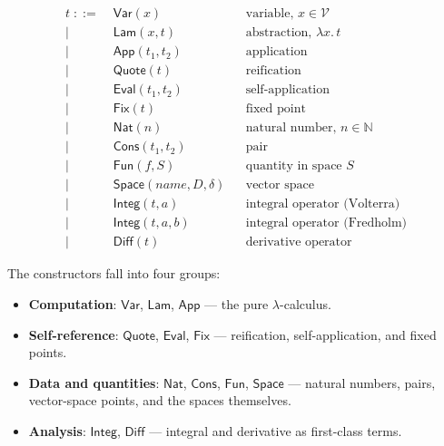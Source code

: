 \documentclass{lmcs}
\theoremstyle{plain}
\theoremstyle{definition}
\newcommand{\NN}{\mathbb{N}}
\newcommand{\fix}{\mathsf{Fix}}
\begin{document}
\begin{defi}[Terms]
\begin{align*}
t \;::=&\;
  \mathsf{Var}(x)                     &&\text{variable, } x \in \mathcal{V}  \\
\mid&\; \mathsf{Lam}(x, t)            &&\text{abstraction, } \lambda x.\, t  \\
\mid&\; \mathsf{App}(t_1, t_2)        &&\text{application}                    \\
\mid&\; \mathsf{Quote}(t)             &&\text{reification}                     \\
\mid&\; \mathsf{Eval}(t_1, t_2)       &&\text{self-application}                \\
\mid&\; \fix(t)                       &&\text{fixed point}                     \\
\mid&\; \mathsf{Nat}(n)               &&\text{natural number, } n \in \NN      \\
\mid&\; \mathsf{Cons}(t_1, t_2)       &&\text{pair}                            \\
\mid&\; \mathsf{Fun}(f, S)            &&\text{quantity in space } S            \\
\mid&\; \mathsf{Space}(\mathit{name}, D, \delta) &&\text{vector space}         \\
\mid&\; \mathsf{Integ}(t, a)          &&\text{integral operator (Volterra)}    \\
\mid&\; \mathsf{Integ}(t, a, b)       &&\text{integral operator (Fredholm)}    \\
\mid&\; \mathsf{Diff}(t)              &&\text{derivative operator}
\end{align*}
\end{defi}

The constructors fall into four groups:
\begin{itemize}
\item \textbf{Computation}: $\mathsf{Var}$, $\mathsf{Lam}$, $\mathsf{App}$
  --- the pure $\lambda$-calculus.
\item \textbf{Self-reference}: $\mathsf{Quote}$, $\mathsf{Eval}$, $\fix$
  --- reification, self-application, and fixed points.
\item \textbf{Data and quantities}: $\mathsf{Nat}$, $\mathsf{Cons}$,
  $\mathsf{Fun}$, $\mathsf{Space}$ --- natural numbers, pairs, vector-space
  points, and the spaces themselves.
\item \textbf{Analysis}: $\mathsf{Integ}$, $\mathsf{Diff}$ --- integral and
  derivative as first-class terms.
\end{itemize}
\end{document}
